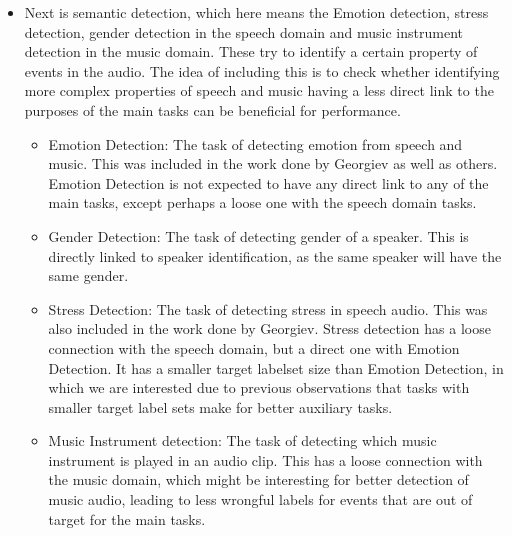 \begin{itemize}
		\item Next is semantic detection, which here means the Emotion detection, stress detection, gender detection in the speech domain and music instrument detection in the music domain. These try to identify a certain property of events in the audio. The idea of including this is to check whether identifying more complex properties of speech and music having a less direct link to the purposes of the main tasks can be beneficial for performance.
		\begin{itemize}
			\item Emotion Detection: The task of detecting emotion from speech and music. This was included in the work done by Georgiev as well as others. Emotion Detection is not expected to have any direct link to any of the main tasks, except perhaps a loose one with the speech domain tasks. 
			\item Gender Detection: The task of detecting gender of a speaker. This is directly linked to speaker identification, as the same speaker will have the same gender. 
			\item  Stress Detection: The task of detecting stress in speech audio. This was also included in the work done by Georgiev. Stress detection has a loose connection with the speech domain, but a direct one with Emotion Detection. It has a smaller target labelset size than Emotion Detection, in which we are interested due to previous observations that tasks with smaller target label sets make for better auxiliary tasks.
			\item  Music Instrument detection: The task of detecting which music instrument is played in an audio clip. This has a loose connection with the music domain, which might be interesting for better detection of music audio, leading to less wrongful labels for events that are out of target for the main tasks.
		\end{itemize}
	

\end{itemize}
